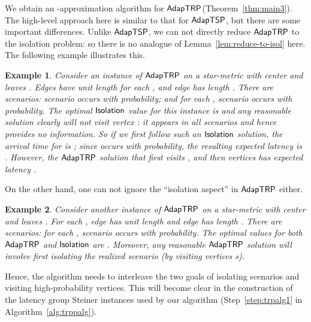 \documentclass[11pt]{article}
\newtheorem{example}{Example}
\def\isoprob{\ensuremath{{\sf Isolation}}\xspace}
\def\stsp{\ensuremath{{\sf AdapTSP}}\xspace}
\def\strp{\ensuremath{{\sf AdapTRP}}\xspace}
\begin{document}
\smallskip

We obtain an -approximation algorithm for \strp (Theorem~\ref{thm:main3}). The high-level approach here is similar to that for \stsp, but there are some important differences. Unlike \stsp, we can not directly reduce \strp to the isolation problem: so there is no analogue of Lemma~\ref{lem:reduce-to-isol} here.  The following example illustrates this.

\smallskip

\begin{example}
Consider an instance of \strp 
on a star-metric with center  and leaves . Edges  have unit length for each , and edge  has length . There
are  scenarios: scenario  occurs with  probability; and for each , scenario
 occurs with  probability. The optimal \isoprob value for this instance is  and any reasonable solution clearly will not visit vertex :  it appears in all scenarios and hence provides no information. So if we first follow such an \isoprob solution, the
arrival time for  is ; 
since  occurs with  probability, the
resulting expected latency is . However, the \strp solution that first visits , and then vertices
 has expected latency . 
\end{example}
\smallskip

On the other hand, one can not ignore
the ``isolation aspect'' in \strp either.

\smallskip\begin{example}
Consider another instance of \strp 
on a star-metric with center  and leaves . For each , edge  has unit length and edge  has length . There
are  scenarios: for each , scenario  occurs with  probability. The optimal values for both \strp and \isoprob are . Moreover, any reasonable \strp solution will involve first isolating the realized scenario (by visiting vertices s).
\end{example}

\smallskip



Hence, the algorithm needs to interleave the two goals of isolating scenarios and visiting high-probability vertices. This will become clear in the construction of the  latency group Steiner  instances used by our algorithm (Step~\ref{step:trpalg1} in Algorithm~\ref{alg:trppalg}).
\end{document}

